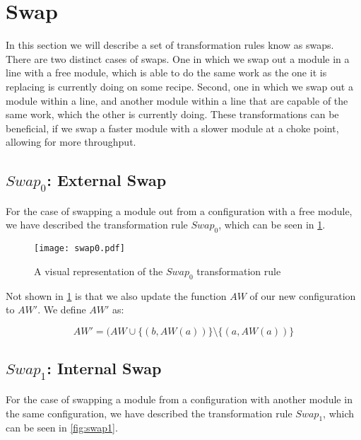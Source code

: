 \section{Swap}
In this section we will describe a set of transformation rules know as swaps. There are two distinct cases of swaps. One in which we swap out a module in a line with a free module, which is able to do the same work as the one it is replacing is currently doing on some recipe. Second, one in which we swap out a module within a line, and another module within a line that are capable of the same work, which the other is currently doing. These transformations can be beneficial, if we swap a faster module with a slower module at a choke point, allowing for more throughput.

\subsection{$Swap_0$: External Swap}
For the case of swapping a module out from a configuration with a free module, we have described the transformation rule $Swap_0$, which can be seen in \cref{fig:swap0}.

\begin{figure}[H]
	\centering
	\texttt{[image: swap0.pdf]}
	\caption{A visual representation of the $Swap_0$ transformation rule}
	\label{fig:swap0}
\end{figure}

Not shown in \cref{fig:swap0} is that we also update the function $AW$ of our new configuration to $AW'$. We define $AW'$ as:

\[AW' = (AW \cup \{(b, AW(a))\} \setminus \{(a, AW(a))\}\]






\subsection{$Swap_1$: Internal Swap}
For the case of swapping a module from a configuration with another module in the same configuration, we have described the transformation rule $Swap_1$, which can be seen in \cref{fig:swap1}.

